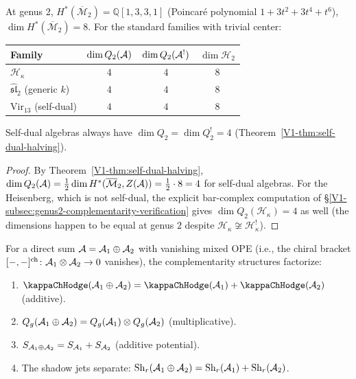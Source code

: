 \begin{proposition}
At genus $2$,
$H^*(\overline{\mathcal{M}}_2) = \mathbb{Q}[1, 3, 3, 1]$
\textup{(}Poincar\'{e} polynomial
$1 + 3t^2 + 3t^4 + t^6$\textup{)},
$\dim H^*(\overline{\mathcal{M}}_2) = 8$.
For the standard families with trivial center:
\begin{center}
\renewcommand{\arraystretch}{1.2}
\begin{tabular}{l@{\quad}c@{\quad}c@{\quad}c}
\textbf{Family}
& $\dim Q_2(\mathcal{A})$
& $\dim Q_2(\mathcal{A}^!)$
& $\dim \mathcal{H}_2$
\\
\midrule
$\mathcal{H}_\kappa$ & $4$ & $4$ & $8$ \\
$\widehat{\mathfrak{sl}}_2$ (generic $k$) & $4$ & $4$ & $8$ \\
$\mathrm{Vir}_{13}$ (self-dual) & $4$ & $4$ & $8$ \\
\end{tabular}
\end{center}
Self-dual algebras always have
$\dim Q_2 = \dim Q_2^! = 4$
\textup{(}Theorem~\textup{\ref{V1-thm:self-dual-halving})}.
\end{proposition}

\begin{proof}
By Theorem~\ref{V1-thm:self-dual-halving},
$\dim Q_2(\mathcal{A}) = \tfrac{1}{2} \dim H^*(\overline{\mathcal{M}}_2,
Z(\mathcal{A})) = \tfrac{1}{2} \cdot 8 = 4$ for self-dual algebras.
For the Heisenberg, which is not self-dual,
the explicit bar-complex computation of
\S\ref{V1-subsec:genus2-complementarity-verification}
gives $\dim Q_2(\mathcal{H}_\kappa) = 4$ as well
(the dimensions happen to be equal at genus $2$ despite
$\mathcal{H}_\kappa \not\cong \mathcal{H}_\kappa^!$).
\end{proof}

\begin{proposition}
For a direct sum $\mathcal{A} = \mathcal{A}_1 \oplus \mathcal{A}_2$ with vanishing
mixed OPE \textup{(}i.e., the chiral bracket
$[-,-]^{\mathrm{ch}} \colon \mathcal{A}_1 \otimes \mathcal{A}_2 \to 0$
vanishes\textup{)}, the complementarity structures factorize:
\begin{enumerate}[label=\textup{(\roman*)}]
\item $\kappaChHodge(\cA_1 \oplus \cA_2)
 = \kappaChHodge(\cA_1) + \kappaChHodge(\cA_2)$
 \textup{(}additive\textup{)}.
\item $Q_g(\mathcal{A}_1 \oplus \mathcal{A}_2)
 = Q_g(\mathcal{A}_1) \otimes Q_g(\mathcal{A}_2)$
 \textup{(}multiplicative\textup{)}.
\item $S_{\mathcal{A}_1 \oplus \mathcal{A}_2}
 = S_{\mathcal{A}_1} + S_{\mathcal{A}_2}$
 \textup{(}additive potential\textup{)}.
\item The shadow jets separate:
 $\mathrm{Sh}_r(\mathcal{A}_1 \oplus \mathcal{A}_2)
 = \mathrm{Sh}_r(\mathcal{A}_1) + \mathrm{Sh}_r(\mathcal{A}_2)$.
\end{enumerate}
\end{proposition}

